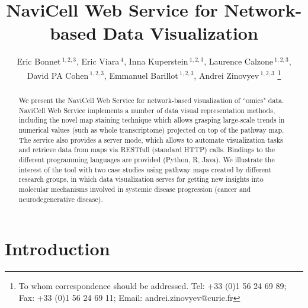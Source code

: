 \documentclass[a4,center,fleqn]{NAR}
\begin{document}
\title{NaviCell Web Service for Network-based Data Visualization}


\author{%
Eric Bonnet\,$^{1,2,3}$,
Eric Viara\,$^{4}$,
Inna Kuperstein\,$^{1,2,3}$,
Laurence Calzone\,$^{1,2,3}$,
David PA Cohen\,$^{1,2,3}$,
Emmanuel Barillot\,$^{1,2,3}$,
Andrei Zinovyev\,$^{1,2,3}$%
\footnote{To whom correspondence should be addressed.
Tel: +33 (0)1 56 24 69 89; Fax: +33 (0)1 56 24 69 11; Email: andrei.zinovyev@curie.fr}}

\address{%
$^{1}$Institut Curie, 26 rue d'Ulm, 75248 Paris, France,
$^{2}$INSERM U900, 75248 Paris, France,
$^{3}$Mines ParisTech, 77300 Fontainebleau, France,
$^{4}$Sysra, 91330 Yerres, France.
}




\maketitle

\begin{abstract}
We present the NaviCell Web
Service for network-based visualization of  ``omics" data.  
NaviCell Web Service implements a number of
data visual representation methods, including the novel map staining technique
which allows grasping large-scale trends in numerical values (such as whole
transcriptome) projected on top of the pathway map. The service also provides a
server mode, which allows to automate visualization tasks and retrieve data
from maps via RESTfull (standard HTTP) calls.  
Bindings to the different programming languages are provided
(Python, R, Java).  We illustrate the interest of the tool
with  two case studies using pathway maps created by different research groups,
in which data visualization serves for getting new insights into molecular
mechanisms involved in systemic disease progression (cancer and
neurodegenerative disease).  

\end{abstract}


\section{Introduction}
\end{document}
